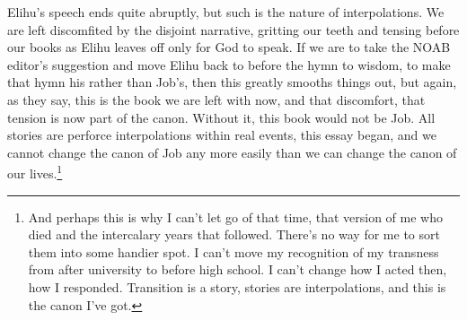 Elihu's speech ends quite abruptly, but such is the nature of interpolations. We are left discomfited by the disjoint narrative, gritting our teeth and tensing before our books as Elihu leaves off only for God to speak. If we are to take the NOAB editor's suggestion and move Elihu back to before the hymn to wisdom, to make that hymn his rather than Job's, then this greatly smooths things out, but again, as they say, this is the book we are left with now, and that discomfort, that tension is now part of the canon. Without it, this book would not be Job. All stories are perforce interpolations within real events, this essay began, and we cannot change the canon of Job any more easily than we can change the canon of our lives.\footnote{And perhaps this is why I can't let go of that time, that version of me who died and the intercalary years that followed. There's no way for me to sort them into some handier spot. I can't move my recognition of my transness from after university to before high school. I can't change how I acted then, how I responded. Transition is a story, stories are interpolations, and this is the canon I've got.}
